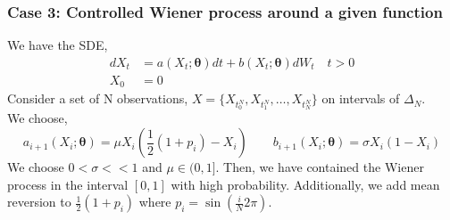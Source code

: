 \documentclass[aspectratio=169]{beamer}\usepackage[utf8]{inputenc}
\begin{document}
{\begin{frame}\frametitle{Case 3: Controlled Wiener process around a given function }
We have the SDE,
\begin{equation}
\begin{split}
dX_t &= a(X_t; \bm{\theta}) dt + b (X_t; \bm{\theta} ) dW_t \quad t > 0 \\
X_0 & = 0
\end{split}\label{main}
\end{equation}
Consider a set of N observations, $X= \{ X_{t_0^N} , X_{t_1^N} ,\ldots , X_{t_N^N} \}$ on intervals of $\Delta_N$.\\ We choose,
\begin{equation}
a_{i+1}(X_i; \bm{\theta})= \mu X_i(\frac{1}{2}(1 + p_i )- X_i)  \quad \quad b_{i+1} (X_i; \bm{\theta} )=\sigma X_i (1-X_i)
\end{equation}
We choose $ 0<\sigma <<1$ and $\mu\in (0,1]$. Then, we have contained the Wiener process in the interval $[0,1]$ with high probability. Additionally, we add mean reversion to $\frac{1}{2}(1 + p_i ) $ where  $p_i = \sin(\frac{i}{N} 2\pi)$.


\end{frame}

}
\end{document}
